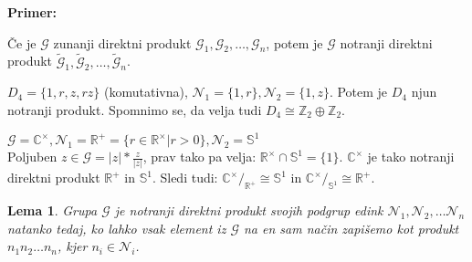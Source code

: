 \documentclass[a4paper]{article}
\newcounter{environment:definition_counter}
\newcounter{environment:theorem_counter}
\newcounter{environment:statement_counter}
\newcounter{example:example_counter}
\newenvironment{example}
{\textbf{Primer:}\\}
{\setcounter{example:example_counter}{0}}
\newenvironment{example_case}
{\refstepcounter{example:example_counter} \arabic{example:example_counter}.}
{\\}
\newtheorem{lemma}{Lema}
\begin{document}
\begin{example}
\begin{example_case}
Če je $\mathcal{G}$ zunanji direktni produkt $\mathcal{G}_1, \mathcal{G}_2, \dots ,\mathcal{G}_n$, potem je $\mathcal{G}$ notranji direktni produkt $\widetilde{\mathcal{G}}_1, \widetilde{\mathcal{G}}_2, \dots , \widetilde{\mathcal{G}}_n$.
\end{example_case}
\begin{example_case}
$D_4 = \{ 1, r, z, rz \} $ (komutativna), $\mathcal{N}_1 = \{ 1,r \}, \mathcal{N}_2 = \{1,z\}$. Potem je $D_4$ njun notranji produkt. Spomnimo se, da velja tudi $D_4 \cong \mathbb{Z}_2 \oplus \mathbb{Z}_2$.
\end{example_case}
\begin{example_case}
$\mathcal{G} = \mathbb{C}^{\times}, \mathcal{N}_1 = \mathbb{R}^{+} = \{ r \in \mathbb{R}^{\times} | r > 0\}, \mathcal{N}_2 = \mathbb{S}^{1}$\\
Poljuben $z \in \mathcal{G} = |z| * \frac{z}{|z|}$, prav tako pa velja: $\mathbb{R}^{\times} \cap \mathbb{S}^1 = \{1\}$. $\mathbb{C}^{\times}$ je tako notranji direktni produkt $\mathbb{R}^{+}$ in $\mathbb{S}^1$. Sledi tudi: $\mathbb{C}^{\times}/_{\mathbb{R}^{+}} \cong \mathbb{S}^1$ in $\mathbb{C}^{\times}/_{\mathbb{S}^{1}} \cong \mathbb{R}^+$.
\end{example_case}
\end{example}

\begin{lemma}
Grupa $\mathcal{G}$ je notranji direktni produkt svojih podgrup edink $\mathcal{N}_1, \mathcal{N}_2, \dots \mathcal{N}_n$ natanko tedaj, ko lahko vsak element iz $\mathcal{G}$ na en sam način zapišemo kot produkt $n_1 n_2 \dots n_n$, kjer $n_i \in \mathcal{N}_i$.
\end{lemma}
\end{document}
